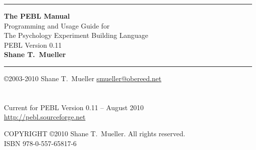 \documentclass[10pt,twoside,openright,titlepage,letter]{book}
\begin{document}
\rule{\textwidth}{1mm}
\begin{center}
\LARGE
\textbf{The PEBL Manual} \\

\large
Programming and Usage Guide for\\
The Psychology Experiment Building Language\\
PEBL Version 0.11\\
\vspace{0.7cm}\Large \textbf{Shane T.~Mueller}
\end{center}
\rule{\textwidth}{1mm}


\vspace{.4cm}

\normalsize
\noindent\copyright 2003-2010 Shane T.~Mueller \href{mailto:smueller@obereed.net}{smueller@obereed.net}\\
\\
\\


Current for PEBL Version 0.11 -- August 2010 \\
\href{http://pebl.sourceforge.net}{http://pebl.sourceforge.net}


\newpage
\normalsize
\noindent COPYRIGHT \copyright 2010 Shane T.~Mueller. All rights reserved.\\
\vspace{2cm}
ISBN  978-0-557-65817-6\\

\tableofcontents

\clearpage
{}
\renewcommand{\chaptermark}[1]{\markboth{\textbf{Chapter \thechapter}.\ \emph{#1}}{}}






\appendix
\end{document}
